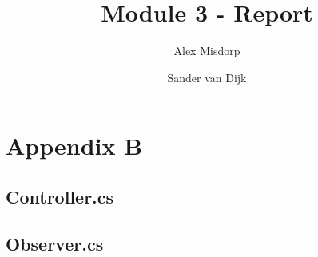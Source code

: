 \documentclass[final]{scrreprt} %
\title{Module 3 - Report}
\author{Alex {Misdorp} \and Sander {van Dijk}}
\begin{document}
\chapter*{Appendix B}

\section{Controller.cs}
\label{appsec:Controller.cs}
\newpage
\section{Observer.cs}
\label{appsec:Observer.cs}
\end{document}

